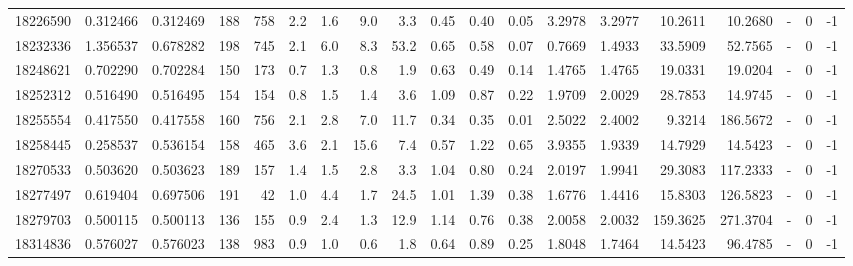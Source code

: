 \begin{tabular}{rrrrrrrrrrrrrrrrlrr}
  18226590 & 0.312466 &   0.312469 &  188 &  758 &      2.2 &      1.6 &     9.0 &      3.3 &       0.45 &        0.40 &        0.05 &  3.2978 &  3.2977 &   10.2611 &   10.2680 &             - &        0 &         -1 \\
  18232336 & 1.356537 &   0.678282 &  198 &  745 &      2.1 &      6.0 &     8.3 &     53.2 &       0.65 &        0.58 &        0.07 &  0.7669 &  1.4933 &   33.5909 &   52.7565 &             - &        0 &         -1 \\
  18248621 & 0.702290 &   0.702284 &  150 &  173 &      0.7 &      1.3 &     0.8 &      1.9 &       0.63 &        0.49 &        0.14 &  1.4765 &  1.4765 &   19.0331 &   19.0204 &             - &        0 &         -1 \\
  18252312 & 0.516490 &   0.516495 &  154 &  154 &      0.8 &      1.5 &     1.4 &      3.6 &       1.09 &        0.87 &        0.22 &  1.9709 &  2.0029 &   28.7853 &   14.9745 &             - &        0 &         -1 \\
  18255554 & 0.417550 &   0.417558 &  160 &  756 &      2.1 &      2.8 &     7.0 &     11.7 &       0.34 &        0.35 &        0.01 &  2.5022 &  2.4002 &    9.3214 &  186.5672 &             - &        0 &         -1 \\
  18258445 & 0.258537 &   0.536154 &  158 &  465 &      3.6 &      2.1 &    15.6 &      7.4 &       0.57 &        1.22 &        0.65 &  3.9355 &  1.9339 &   14.7929 &   14.5423 &             - &        0 &         -1 \\
  18270533 & 0.503620 &   0.503623 &  189 &  157 &      1.4 &      1.5 &     2.8 &      3.3 &       1.04 &        0.80 &        0.24 &  2.0197 &  1.9941 &   29.3083 &  117.2333 &             - &        0 &         -1 \\
  18277497 & 0.619404 &   0.697506 &  191 &   42 &      1.0 &      4.4 &     1.7 &     24.5 &       1.01 &        1.39 &        0.38 &  1.6776 &  1.4416 &   15.8303 &  126.5823 &             - &        0 &         -1 \\
  18279703 & 0.500115 &   0.500113 &  136 &  155 &      0.9 &      2.4 &     1.3 &     12.9 &       1.14 &        0.76 &        0.38 &  2.0058 &  2.0032 &  159.3625 &  271.3704 &             - &        0 &         -1 \\
  18314836 & 0.576027 &   0.576023 &  138 &  983 &      0.9 &      1.0 &     0.6 &      1.8 &       0.64 &        0.89 &        0.25 &  1.8048 &  1.7464 &   14.5423 &   96.4785 &             - &        0 &         -1 \\

\end{tabular}
